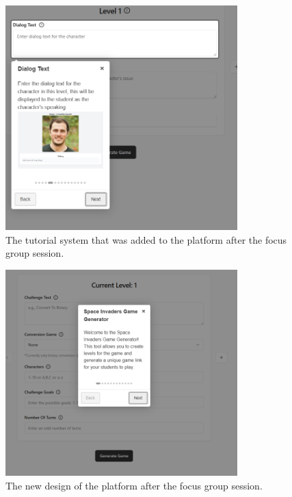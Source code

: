 \begin{figure}
    \centering
    \includegraphics[width=0.8\textwidth]{figures/Diagnose_Game/Instructor_Portal_Diagnose_Game_hint.png}
    \caption{The tutorial system that was added to the platform after the focus group session.}
    \label{fig:tutorial}
\end{figure}

\begin{figure}
    \centering
    \includegraphics[width=0.8\textwidth]{figures/Space_Invaders/Instructor_Portal_Space_Invader_hint.png}
    \caption{The new design of the platform after the focus group session.}
    \label{fig:hint}
\end{figure}

